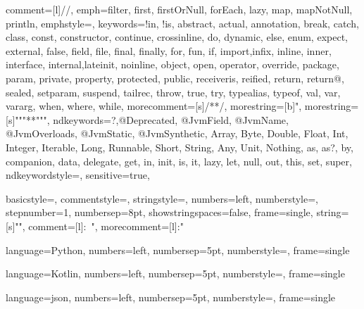 
{
  comment=[l]{//},
  emph={filter, first, firstOrNull, forEach, lazy, map, mapNotNull, println},
  emphstyle={\color{OrangeRed}},
  keywords={!in, !is, abstract, actual, annotation,  break, catch, class, const, constructor, continue, crossinline, do, dynamic, else, enum, expect, external, false, field, file, final, finally, for, fun, if, import,infix, inline, inner, interface, internal,lateinit, noinline, object, open, operator, override, package, param, private, property, protected, public, receiveris, reified, return, return@, sealed, setparam, suspend, tailrec, throw, true, try, typealias, typeof, val, var, vararg, when, where, while},
  morecomment=[s]{/*}{*/},
  morestring=[b]",
  morestring=[s]{"""*}{*"""},
  ndkeywords={?,@Deprecated, @JvmField, @JvmName, @JvmOverloads, @JvmStatic, @JvmSynthetic, Array, Byte, Double, Float, Int, Integer, Iterable, Long, Runnable, Short, String, Any, Unit, Nothing, as, as?, by, companion, data, delegate, get, in, init, is, it, lazy, let, null, out, this, set, super},
  ndkeywordstyle={\color{OrangeRed}\bfseries},
  sensitive=true,
}

{
    basicstyle=\small\ttfamily,
    commentstyle=\color{eclipseStrings}, %
    stringstyle=\color{eclipseKeywords}, %
    numbers=left,
    numberstyle=\scriptsize,
    stepnumber=1,
    numbersep=8pt,
    showstringspaces=false,
    frame=single,
    string=[s]{"}{"},
    comment=[l]{:\ "},
    morecomment=[l]{:"}
}


{
    language=Python,
    numbers=left,                       %
    numbersep=5pt,                      %
    numberstyle=\small\color{gray},     %
    frame=single	                    %
}

{
    language=Kotlin,
    numbers=left,                    
    numbersep=5pt,                   
    numberstyle=\small\color{gray}, 
    frame=single
}

{
    language=json,
    numbers=left,                   
    numbersep=5pt,                   
    numberstyle=\small\color{gray}, 
    frame=single
}
